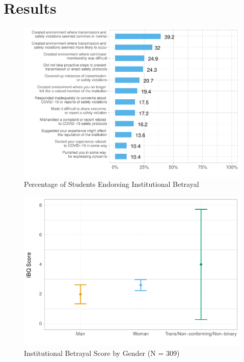\documentclass[
  english,
  man, noextraspace]{apa6}
\begin{document}
\hypertarget{results}{%
\section{Results}\label{results}}

\begin{figure}[H]

{\centering \includegraphics[width=\textwidth]{papaja_doc_files/figure-latex/figure1-1} 

}

\caption{Percentage of Students Endorsing Institutional Betrayal
}\label{fig:figure1}
\end{figure}

\begin{figure}[H]

{\centering \includegraphics[width=\textwidth]{papaja_doc_files/figure-latex/figure2-1} 

}

\caption{Institutional Betrayal Score by Gender (N = 309) 
}\label{fig:figure2}
\end{figure}
\end{document}
